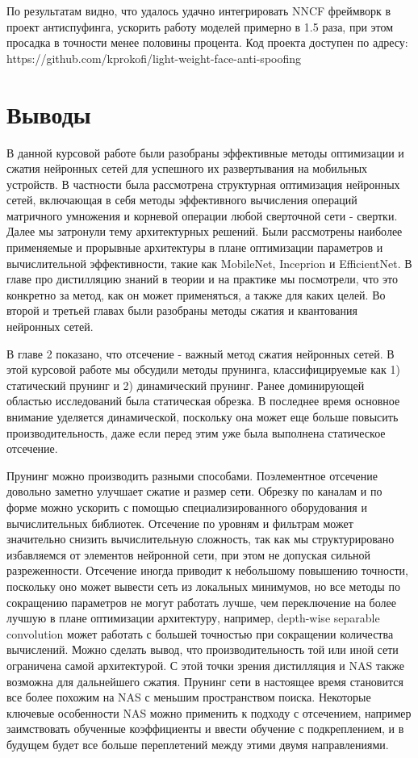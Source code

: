 \documentclass[oneside,final,12pt]{extreport}
\begin{document}
По результатам видно, что удалось удачно интегрировать NNCF фреймворк в проект антиспуфинга, ускорить работу моделей примерно в 1.5 раза, при этом просадка в точности менее половины процента. Код проекта доступен по адресу: https://github.com/kprokofi/light-weight-face-anti-spoofing

\chapter{Выводы}

В данной курсовой работе были разобраны эффективные методы оптимизации и сжатия нейронных сетей для успешного их развертывания на мобильных устройств. В частности была рассмотрена структурная оптимизация нейронных сетей, включающая в себя методы эффективного вычисления операций матричного умножения и корневой операции любой сверточной сети - свертки. Далее мы затронули тему архитектурных решений. Были рассмотрены наиболее применяемые и прорывные архитектуры в плане оптимизации параметров и вычислительной эффективности, такие как MobileNet, Inceprion и EfficientNet. В главе про дистилляцию знаний в теории и на практике мы посмотрели, что это конкретно за метод, как он может применяться, а также для каких целей. Во второй и третьей главах были разобраны методы сжатия и квантования нейронных сетей.

В главе 2 показано, что отсечение - важный метод сжатия нейронных сетей. В этой курсовой работе мы обсудили методы прунинга, классифицируемые как 1) статический прунинг и 2) динамический прунинг. Ранее доминирующей областью исследований была статическая обрезка. В последнее время основное внимание уделяется динамической, поскольку она может еще больше повысить производительность, даже если перед этим уже была выполнена статическое отсечение.

Прунинг можно производить разными способами. Поэлементное отсечение довольно заметно улучшает сжатие и размер сети. Обрезку по каналам и по форме можно ускорить с помощью специализированного оборудования и вычислительных библиотек. Отсечение по уровням и фильтрам может значительно снизить вычислительную сложность, так как мы структурировано избавляемся от элементов нейронной сети, при этом не допуская сильной разреженности. Отсечение иногда приводит к небольшому повышению точности, поскольку оно может вывести сеть из локальных минимумов, но все методы по сокращению параметров не могут работать лучше, чем переключение на более лучшую в плане оптимизации архитектуру, например, depth-wise separable convolution может работать с большей точностью при сокращении количества вычислений. Можно сделать вывод, что производительность той или иной сети ограничена самой архитектурой. С этой точки зрения дистилляция и NAS также возможна для дальнейшего сжатия. Прунинг сети в настоящее время становится все более похожим на NAS с меньшим пространством поиска. Некоторые ключевые особенности NAS можно применить к подходу с отсечением, например заимствовать обученные коэффициенты и ввести обучение с подкреплением, и в будущем будет все больше переплетений между этими двумя направлениями. 
\end{document}
